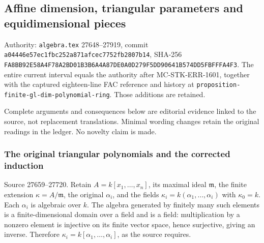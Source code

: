 \subsection{Affine dimension, triangular parameters and equidimensional pieces}\label{algebra-proof-025-affine-dimension-triangular-parameters-and-equidimensional-pieces}

Authority: \texttt{algebra.tex} 27648--27919, commit \texttt{a044\allowbreak{}46e5\allowbreak{}7ec1\allowbreak{}fbc2\allowbreak{}52a8\allowbreak{}71af\allowbreak{}cec7\allowbreak{}752f\allowbreak{}b280\allowbreak{}7b14}, SHA-256 \texttt{FA8B\allowbreak{}B92E\allowbreak{}58A4\allowbreak{}F78A\allowbreak{}2BD0\allowbreak{}1B3B\allowbreak{}6A4A\allowbreak{}87DE\allowbreak{}0A0D\allowbreak{}279F\allowbreak{}5DD9\allowbreak{}0641\allowbreak{}B574\allowbreak{}DD5F\allowbreak{}BFFF\allowbreak{}A4F3}. The entire current interval equals the authority after MC-\AlgebraIdentifierBreak{}STK-\AlgebraIdentifierBreak{}ERR-\AlgebraIdentifierBreak{}1601, together with the captured eighteen-line FAC reference and history at \texttt{proposition-\AlgebraIdentifierBreak{}finite-\AlgebraIdentifierBreak{}gl-\AlgebraIdentifierBreak{}dim-\AlgebraIdentifierBreak{}polynomial-\AlgebraIdentifierBreak{}ring}. Those additions are retained.

Complete arguments and consequences below are editorial evidence linked to the source, not replacement translations. Minimal wording changes retain the original readings in the ledger. No novelty claim is made.

\subsubsection{The original triangular polynomials and the corrected induction}\label{algebra-proof-025-the-original-triangular-polynomials-and-the-corrected-induction}

Source 27659--27720. Retain \(A=k[x_1,\ldots,x_n]\), its maximal ideal \(\mathfrak m\), the finite extension \(\kappa=A/\mathfrak m\), the original \(\alpha_i\), and the fields \(\kappa_i=k(\alpha_1,\ldots,\alpha_i)\) with \(\kappa_0=k\). Each \(\alpha_i\) is algebraic over \(k\). The algebra generated by finitely many such elements is a finite-dimensional domain over a field and is a field: multiplication by a nonzero element is injective on its finite vector space, hence surjective, giving an inverse. Therefore \(\kappa_i=k[\alpha_1,\ldots,\alpha_i]\), as the source requires.

